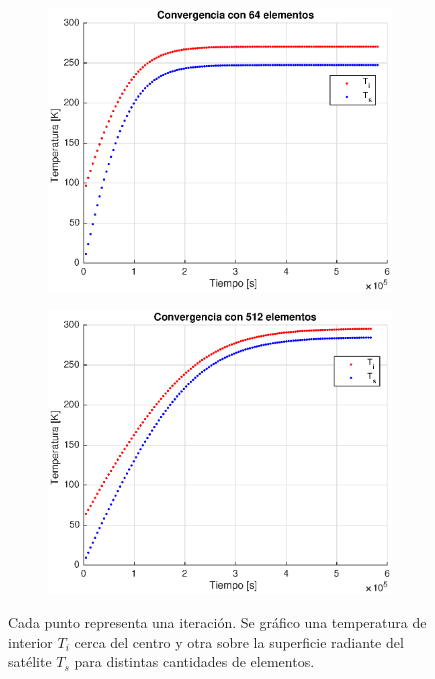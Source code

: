 \documentclass[onecolumn,10pt,titlepage,a4paper]{article}
\begin{document}
\begin{figure}[htb!]
	\centering
	\begin{subfigure}{0.47\textwidth}
\includegraphics[width=\textwidth]{fig/convergencia64.eps}
\label{fig:Convergencia64}
	\end{subfigure}
	\hfill
	\begin{subfigure}{0.5\textwidth}
	\includegraphics[width=\textwidth]{fig/convergencia512.eps}
\label{fig:Convergencia512}
	\end{subfigure}
\caption{Cada punto representa una iteración. Se gráfico una temperatura de interior $T_i$ cerca del centro y otra sobre la superficie radiante del satélite $T_s$ para distintas cantidades de elementos.}
\label{fig:Convergencia}
\end{figure}
\end{document}
